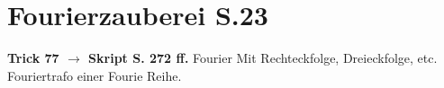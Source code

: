 \section{Fourierzauberei S.23}
\textbf{Trick 77 $\rightarrow$ Skript S. 272 ff.} Fourier Mit Rechteckfolge, Dreieckfolge, etc. Fouriertrafo einer Fourie Reihe.



\newpage
